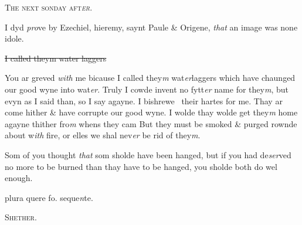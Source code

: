 \documentclass[12pt, a4paper]{book}
\begin{document}
               
                  
				\begin{center}  {\scshape 
                     The next sonday aft\textit{er}.
                  }  \end{center}
			


				\marginpar[\vspace{0.5cm}{\textcolor{Gray}{Images}}]{}
			
				\marginpar[\vspace{0.5cm}{\textcolor{Gray}{n}}]{}
			
		\ifthenelse{\isodd{\thepage}}
		{\reversemarginpar}
		{\normalmarginpar}
		 I dyd \textit{pro}ve by Ezechiel, hieremy, saynt Paule \&
 Origene, \textit{that} an image was none idole.

		\ifthenelse{\isodd{\thepage}}
		{\reversemarginpar}
		{\normalmarginpar}
		\sout{ I called theym water laggers}
               	
				\marginpar[\vspace{0.5cm}{\textcolor{Gray}{seditiousn}}]{}
			
		\ifthenelse{\isodd{\thepage}}
		{\reversemarginpar}
		{\normalmarginpar}
		 You ar greved \textit{with} me bicause I called they\textit{m} wat\textit{er}laggers
 which have chaunged our good wyne into wat\textit{er}.
 Truly I cowde invent no fytt\textit{er} name for they\textit{m}, but
 evyn as I said than, so I say agayne. I bishrewe 
 their hartes for me. Thay ar come hither \& have
 corrupte our good wyne. I wolde thay wolde get
 they\textit{m} home agayne thither fro\textit{m} whens they cam
 But they must be smoked \& purged rownde about
 w\textit{ith} fire, or elles we shal nev\textit{er} be rid of they\textit{m}.
               	
				\marginpar[\vspace{0.5cm}{\textcolor{Gray}{seditious n}}]{}
			
		\ifthenelse{\isodd{\thepage}}
		{\reversemarginpar}
		{\normalmarginpar}
		 Som of you thought \textit{that} som sholde have been
 hanged, but if you had de\textit{ser}ved no more to be burned
 than thay have to be hanged, you sholde both do
 wel enough.
               	
		\ifthenelse{\isodd{\thepage}}
		{\reversemarginpar}
		{\normalmarginpar}
		plura quere fo. seque\textit{n}te.
 

            
            
            	
				\begin{center} \begin{large} {\scshape Shether.} \end{large} \end{center}
			
\end{document}
